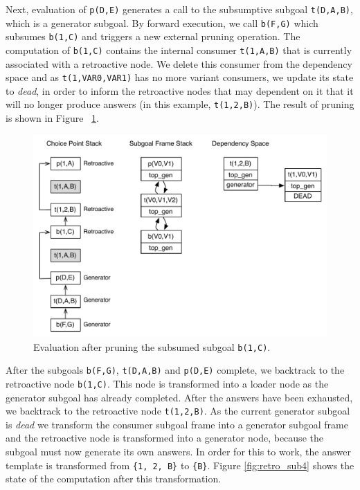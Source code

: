 Next, evaluation of \texttt{p(D,E)} generates a call to the subsumptive subgoal \texttt{t(D,A,B)}, which
is a generator subgoal. By forward execution, we call \texttt{b(F,G)} which subsumes \texttt{b(1,C)} and triggers
a new external pruning operation. The computation of \texttt{b(1,C)} contains the internal consumer
\texttt{t(1,A,B)} that is currently associated with a retroactive node. We delete this consumer from the
dependency space and as \texttt{t(1,VAR0,VAR1)} has no more variant consumers,
we update its state to \textit{dead}, in order to inform the retroactive nodes that may dependent on it that it
will no longer produce answers (in this example, \texttt{t(1,2,B)}). The result of pruning is shown in
Figure ~\ref{fig:retro_sub3}.

\begin{figure}[ht]
  \centering
    \includegraphics[scale=0.5]{retro_sub3.pdf}
  \caption{Evaluation after pruning the subsumed subgoal \texttt{b(1,C)}.}
  \label{fig:retro_sub3}
\end{figure}

After the subgoals \texttt{b(F,G)}, \texttt{t(D,A,B)} and \texttt{p(D,E)} complete, we backtrack to
the retroactive node \texttt{b(1,C)}. This node is transformed into a loader node as the generator
subgoal has already completed. After the answers have been exhausted, we backtrack to the retroactive
node \texttt{t(1,2,B)}. As the current generator subgoal is \textit{dead} we transform the consumer subgoal
frame into a generator subgoal frame and the retroactive node is transformed into a generator node, because
the subgoal must now generate its own answers. In order for this to work, the answer template is transformed
from \texttt{\{1,~2,~B\}} to \texttt{\{B\}}. Figure \ref{fig:retro_sub4} shows the state of the computation
after this transformation.

